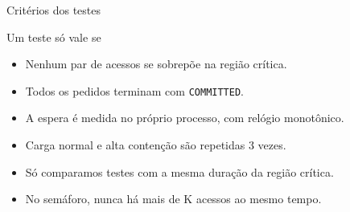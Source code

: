\documentclass[aspectratio=169,11pt]{beamer}
\begin{document}
\begin{frame}{Critérios dos testes}
\begin{block}{Um teste só vale se}
\begin{itemize}\setlength\itemsep{0.2cm}
\item Nenhum par de acessos se sobrepõe na região crítica.
\item Todos os pedidos terminam com \texttt{COMMITTED}.
\item A espera é medida no próprio processo, com relógio monotônico.
\item Carga normal e alta contenção são repetidas 3 vezes.
\item Só comparamos testes com a mesma duração da região crítica.
\item No semáforo, nunca há mais de K acessos ao mesmo tempo.
\end{itemize}\end{block}
\end{frame}
\end{document}
